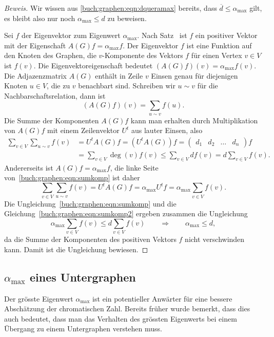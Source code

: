 \begin{proof}[Beweis]
Wir wissen aus \eqref{buch:graphen:eqn:dqueramax} bereits, dass
$\overline{d}\le\alpha_{\text{max}}$ gilt, es bleibt also nur noch
$\alpha_{\text{max}}\le d$ zu beweisen.

Sei $f$ der Eigenvektor zum Eigenwert $\alpha_{\text{max}}$.
Nach Satz~\label{buch:wahrscheinlichkeit:satz:perron-frobenius2}
ist $f$ ein positiver Vektor mit der Eigenschaft $A(G)f=\alpha_{\text{max}}f$.
Der Eigenvektor $f$ ist eine Funktion auf den Knoten des Graphen,
die $v$-Komponente des Vektors $f$ für einen Vertex $v\in V$ ist $f(v)$.
Die Eigenvektoreigenschaft bedeutet $(A(G)f)(v)=\alpha_{\text{max}} f(v)$.
Die Adjazenzmatrix $A(G)$ enthält in Zeile $v$ Einsen genau für diejenigen
Knoten $u\in V$, die zu $v$ benachbart sind.
Schreiben wir $u\sim v$ für die Nachbarschaftsrelation, dann ist 
\[
(A(G)f)(v)
=
\sum_{u\sim v} f(u).
\]
Die Summe der Komponenten $A(G)f$ kann man erhalten durch Multiplikation
von $A(G)f$ mit einem Zeilenvektor $U^t$ aus lauter Einsen, also
\begin{equation}
\begin{aligned}
\sum_{v\in V}\sum_{u\sim v}f(v)
&=
U^tA(G)f
=
(U^tA(G))f
=
\begin{pmatrix}d_1&d_2&\dots&d_n\end{pmatrix} f
\\
&=
\sum_{v\in V}\deg (v) f(v)
\le
\sum_{v\in V}df(v)
=
d
\sum_{v\in V}f(v).
\end{aligned}
\label{buch:graphen:eqn:sumkomp}
\end{equation}
Andererseits ist $A(G)f=\alpha_{\text{max}}f$, die linke Seite
von~\eqref{buch:graphen:eqn:sumkomp} ist daher
\begin{equation}
\sum_{v\in V}\sum_{u\sim v}f(v)
=
U^tA(G)f
=
\alpha_{\text{max}}
U^tf
=
\alpha_{\text{max}} \sum_{v\in V}f(v).
\label{buch:graphen:eqn:sumkomp2}
\end{equation}
Die Ungleichung~\eqref{buch:graphen:eqn:sumkomp}
und die Gleichung~\eqref{buch:graphen:eqn:sumkomp2} ergeben zusammen
die Ungleichung
\[
\alpha_{\text{max}} \sum_{v\in V}f(v)
\le d\sum_{v\in V}f(v)
\qquad\Rightarrow\qquad
\alpha_{\text{max}} \le d,
\]
da die Summe der Komponenten des positiven Vektors $f$ nicht verschwinden
kann.
Damit ist die Ungleichung bewiesen.
\end{proof}

%
%
\subsection{$\alpha_{\text{max}}$ eines Untergraphen
\label{buch:subsection:alphamax-eines-untergraphen}}
Der grösste Eigenwert $\alpha_{\text{max}}$ ist ein potentieller 
Anwärter für eine bessere Abschätzung der chromatischen Zahl.
Bereits früher wurde bemerkt, dass dies auch bedeutet, dass man 
das Verhalten des grössten Eigenwerts bei einem Übergang zu einem
Untergraphen verstehen muss.

